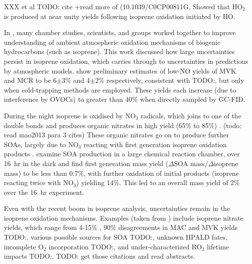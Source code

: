    XXX et al TODO: cite +read more of (10.1039/C0CP00811G, %
    Showed that HO$_2$ is produced at near unity yields following isoprene oxidation initiated by HO.
      
    In \cite{Nguyen2014}, many chamber studies, scientists, and groups worked together to improve understanding of ambient atmospheric oxidation mechanisms of biogenic hydrocarbons (such as isoprene). 
    This work discussed how large uncertainties persist in isoprene oxidation, which carries through to uncertainties in predictions by atmospheric models.
    \cite{Nguyen2014} show preliminary estimates of low-NO yields of MVK and MCR to be 6$\pm3\%$ and 4$\pm2\%$ respectively, consistent with TODO:\cite{Liu2013}, but only when cold-trapping methods are employed.
    These yields each increase (due to interference by OVOCs) to greater than 40\% when directly sampled by GC-FID.
      
    During the night isoprene is oxidised by NO$_3$ radicals, which joins to one of the double bonds and produces organic nitrates in high yield (65\% to 85\%) \citep{Mao2013}. (todo: read mao2013 para 3 cites)
    These organic nitrates go on to produce further SOAs, largely due to NO$_3$ reacting with first generation isoprene oxidation products \citep{Rollins2009}.
    \cite{Rollins2009} examine SOA production in a large chemical reaction chamber, over 16~hr in the dark and find first generation mass yield ($\Delta$SOA mass$/\Delta$isoprene mass) to be less than 0.7\%, with further oxidation of initial products (isoprene reacting twice with NO$_3$) yielding 14\%.
    This led to an overall mass yield of 2\% over the 16~hr experiment.
      
    Even with the recent boom in isoprene analysis, uncertainties remain in the isoprene oxidation mechanisms.
    Examples (taken from \citet{Nguyen2014}) include isoprene nitrate yields, which range from 4-15\% \citep{Paulot2009a}, 90\% disagreements in MAC and MVK yields TODO:\citep{Liu2013}, various possible sources for SOA TODO:\citep{Chan2010, Surratt2010, Lin2013}, unknown HPALD fates, incomplete O$_2$ incorporation TODO:\citep{Peeters2009,Crounse2013}, and under-characterized RO$_2$ lifetime impacts TODO:\citep{Wolfe2012}. TODO: get those citations and read abstracts.
    

